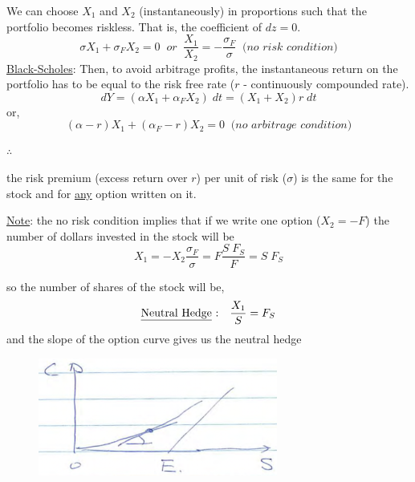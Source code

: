 \documentclass[
14pt,notheorems,hyperref={pdfauthor=whatever}
]{beamer}
\begin{document}
\begin{frame}
We can choose $X_1$ and $X_2$ (instantaneously) in proportions such that the portfolio becomes riskless. That is, the coefficient of $dz=0$.
\[\sigma X_1 + \sigma_F X_2 = 0 \;\; or \;\; \frac{X_1}{X_2} = - \frac{\sigma_F}{\sigma} \;\; \textit{(no risk condition)}\]
\underline{Black-Scholes}: Then, to avoid arbitrage profits, the instantaneous return on the portfolio has to be equal to the risk free rate ($r$ - continuously compounded rate).\\
\[dY = (\alpha X_1 + \alpha_F X_2)\;dt = (X_1 + X_2)r\;dt\]
or,
\[(\alpha-r)X_1+(\alpha_F-r)X_2 = 0 \;\; \textit{(no arbitrage condition)}\]
\begin{center}
$\therefore$     
\end{center}
\end{frame}

\begin{frame}
\begin{center}
 the risk premium (excess return over $r$) per unit of risk ($\sigma$) is the same for the stock and for \underline{any} option written on it.\\
\end{center}
\hfill\break
\underline{Note}: the no risk condition implies that if we write one option ($X_2 = -F$) the number of dollars invested in the stock will be\\
\[ X_1 = -X_2 \frac{\sigma_F}{\sigma} = F \frac{S\;F_S}{F} = S\;F_S\]
\end{frame}

\begin{frame}
so the number of shares of the stock will be,
\[ \text{\underline{Neutral Hedge} : } \;\; \frac{X_1}{S} = F_S\]
and the slope of the option curve gives us the neutral hedge\\
\begin{figure}[neutral-hedge]
    \includegraphics[width=0.7\textwidth]{images/L14-neutralhedge.png}
    \centering
\end{figure}
\end{frame}
\end{document}
